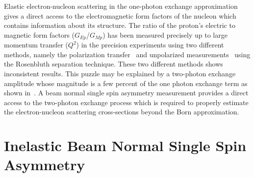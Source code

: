 

Elastic electron-nucleon scattering in the one-photon exchange approximation gives a direct access to the electromagnetic form factors of the nucleon which contains information about its structure. The ratio of the proton's electric to magnetic form factors ($G_{Ep}$/$G_{Mp}$) has been measured precisely up to large momentum transfer ($Q^{2}$) in the precision experiments using two different methods, namely the polarization transfer~\cite{PhysRevLett.84.1398, PhysRevLett.88.092301} and unpolarized measurements~\cite{PhysRevD.50.5491, PhysRevC.70.015206, Arrington:2003tq} using the Rosenbluth separation technique. These two different methods shows inconsistent results.
This puzzle may be explained by a two-photon exchange amplitude whose magnitude is a few percent of the one
photon exchange term as shown in~\cite{PhysRevLett.91.142303}.
A beam normal single spin asymmetry measurement provides a direct access to the two-photon exchange process which is required to properly estimate the electron-nucleon scattering cross-sections beyond the Born approximation.


\section{Inelastic Beam Normal Single Spin Asymmetry}%
\label{Inelastic Beam Normal Single Spin Asymmetry}


